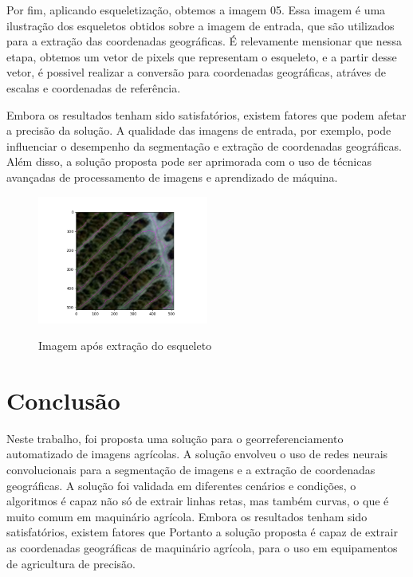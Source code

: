 \documentclass[conference]{IEEEtran}
\begin{document}
Por fim, aplicando esqueletização, obtemos a imagem 05. Essa imagem é uma ilustração dos esqueletos
obtidos sobre a imagem de entrada, que são utilizados para a extração das coordenadas geográficas. É relevamente mensionar que
nessa etapa, obtemos um vetor de pixels que representam o esqueleto, e a partir desse vetor, é possivel
realizar a conversão para coordenadas geográficas, atráves de escalas e coordenadas de referência.

Embora os resultados tenham sido satisfatórios, existem fatores que podem afetar a precisão da solução.
A qualidade das imagens de entrada, por exemplo, pode influenciar o desempenho da segmentação e extração
de coordenadas geográficas. Além disso, a solução proposta pode ser aprimorada com o uso de técnicas
avançadas de processamento de imagens e aprendizado de máquina.

\begin{figure}
    \centering
    \caption{Imagem após extração do esqueleto}
    \includegraphics[width=0.5\textwidth]{images/06.png}
    \label{fig:03}
\end{figure}

\section{Conclusão}
Neste trabalho, foi proposta uma solução para o georreferenciamento automatizado de imagens agrícolas.
A solução envolveu o uso de redes neurais convolucionais para a segmentação de imagens e a extração 
de coordenadas geográficas. A solução foi validada em diferentes cenários e condições, o algoritmos é 
capaz não só de extrair linhas retas, mas também curvas, o que é muito comum em maquinário agrícola.
Embora os resultados tenham sido satisfatórios, existem fatores que 
Portanto a solução proposta é capaz de extrair as coordenadas geográficas de maquinário agrícola,
para o uso em equipamentos de agricultura de precisão.


\end{document}
